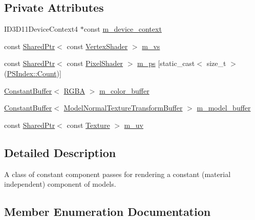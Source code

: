 \subsection*{Private Attributes}
\begin{DoxyCompactItemize}
\item 
I\+D3\+D11\+Device\+Context4 $\ast$const \hyperlink{classmage_1_1_constant_component_pass_a1d4bf6c730c94397219de2a447d1f368}{m\+\_\+device\+\_\+context}
\item 
const \hyperlink{namespacemage_a1e01ae66713838a7a67d30e44c67703e}{Shared\+Ptr}$<$ const \hyperlink{classmage_1_1_vertex_shader}{Vertex\+Shader} $>$ \hyperlink{classmage_1_1_constant_component_pass_aec78ab8193d28847ad591947f03f6515}{m\+\_\+vs}
\item 
const \hyperlink{namespacemage_a1e01ae66713838a7a67d30e44c67703e}{Shared\+Ptr}$<$ const \hyperlink{namespacemage_a27ecaf266420ee7a494d64edc0757129}{Pixel\+Shader} $>$ \hyperlink{classmage_1_1_constant_component_pass_a932366be8feba629aa2dd29a844e38b8}{m\+\_\+ps} \mbox{[}static\+\_\+cast$<$ size\+\_\+t $>$(\hyperlink{classmage_1_1_constant_component_pass_abad8858867cb29081767f13ba6cdb366ae93f994f01c537c4e2f7d8528c3eb5e9}{P\+S\+Index\+::\+Count})\mbox{]}
\item 
\hyperlink{classmage_1_1_constant_buffer}{Constant\+Buffer}$<$ \hyperlink{structmage_1_1_r_g_b_a}{R\+G\+BA} $>$ \hyperlink{classmage_1_1_constant_component_pass_a0dce8281280284768371542d88c17eee}{m\+\_\+color\+\_\+buffer}
\item 
\hyperlink{classmage_1_1_constant_buffer}{Constant\+Buffer}$<$ \hyperlink{structmage_1_1_model_normal_texture_transform_buffer}{Model\+Normal\+Texture\+Transform\+Buffer} $>$ \hyperlink{classmage_1_1_constant_component_pass_a012197b5473955c356d2fbc48f9d3e8b}{m\+\_\+model\+\_\+buffer}
\item 
const \hyperlink{namespacemage_a1e01ae66713838a7a67d30e44c67703e}{Shared\+Ptr}$<$ const \hyperlink{classmage_1_1_texture}{Texture} $>$ \hyperlink{classmage_1_1_constant_component_pass_ad69f0d02de95b9125651b447cd8fd884}{m\+\_\+uv}
\end{DoxyCompactItemize}


\subsection{Detailed Description}
A class of constant component passes for rendering a constant (material independent) component of models. 

\subsection{Member Enumeration Documentation}
\hypertarget{classmage_1_1_constant_component_pass_abad8858867cb29081767f13ba6cdb366}{}\label{classmage_1_1_constant_component_pass_abad8858867cb29081767f13ba6cdb366} 
